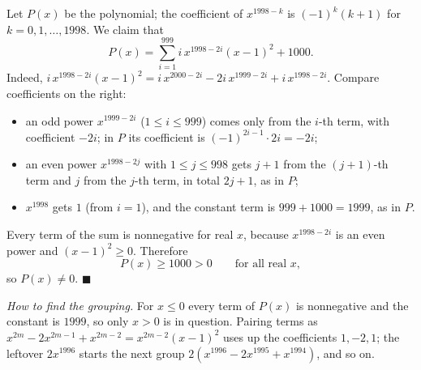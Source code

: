 Let $P(x)$ be the polynomial; the coefficient of $x^{1998-k}$ is $(-1)^k(k+1)$ for $k=0,1,\dots,1998$. We claim that
\[P(x)=\sum_{i=1}^{999}i\,x^{1998-2i}(x-1)^2+1000.\]
Indeed, $i\,x^{1998-2i}(x-1)^2=i\,x^{2000-2i}-2i\,x^{1999-2i}+i\,x^{1998-2i}$. Compare coefficients on the right:
\begin{itemize}
\item an odd power $x^{1999-2i}$ ($1\le i\le999$) comes only from the $i$-th term, with coefficient $-2i$; in $P$ its coefficient is $(-1)^{2i-1}\cdot2i=-2i$;
\item an even power $x^{1998-2j}$ with $1\le j\le998$ gets $j+1$ from the $(j+1)$-th term and $j$ from the $j$-th term, in total $2j+1$, as in $P$;
\item $x^{1998}$ gets $1$ (from $i=1$), and the constant term is $999+1000=1999$, as in $P$.
\end{itemize}
Every term of the sum is nonnegative for real $x$, because $x^{1998-2i}$ is an even power and $(x-1)^2\ge0$. Therefore
\[P(x)\ge1000>0\qquad\text{for all real }x,\]
so $P(x)\ne0$. $\blacksquare$

\emph{How to find the grouping.} For $x\le0$ every term of $P(x)$ is nonnegative and the constant is $1999$, so only $x>0$ is in question. Pairing terms as $x^{2m}-2x^{2m-1}+x^{2m-2}=x^{2m-2}(x-1)^2$ uses up the coefficients $1,-2,1$; the leftover $2x^{1996}$ starts the next group $2\left(x^{1996}-2x^{1995}+x^{1994}\right)$, and so on.
